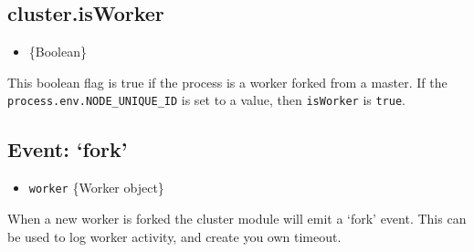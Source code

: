 \subsection{cluster.isWorker}

\begin{itemize}
\item
  \{Boolean\}
\end{itemize}

This boolean flag is true if the process is a worker forked from a
master. If the \texttt{process.env.NODE\_UNIQUE\_ID} is set to a value,
then \texttt{isWorker} is \texttt{true}.

\subsection{Event: `fork'}

\begin{itemize}
\item
  \texttt{worker} \{Worker object\}
\end{itemize}

When a new worker is forked the cluster module will emit a `fork' event.
This can be used to log worker activity, and create you own timeout.

\begin{Shaded}
\begin{Highlighting}[]
 
 
  \NormalTok{(}\NormalTok{);}
\NormalTok{\}}

\NormalTok{(}\NormalTok{, }
  \NormalTok{timeouts[}\NormalTok{] = setTimeout(errorMsg, }\NormalTok{);}
\NormalTok{\});}
\NormalTok{(}\NormalTok{, }
  \NormalTok{clearTimeout(timeouts[}\NormalTok{]);}
\NormalTok{\});}
\NormalTok{(}\NormalTok{, }
  \NormalTok{clearTimeout(timeouts[}\NormalTok{]);}
\NormalTok{\});}
\end{Highlighting}
\end{Shaded}

